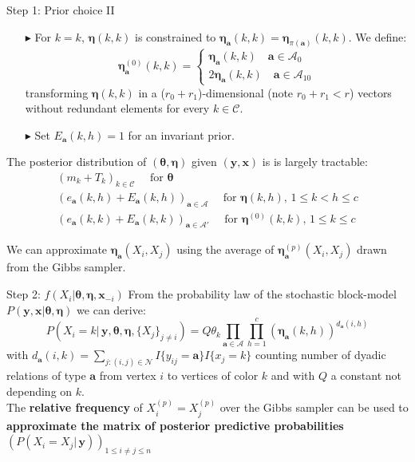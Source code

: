 \documentclass[aspectratio=169,xcolor=dvipsnames]{beamer}
\newcommand{\veca}{\boldsymbol{a}}
\newcommand{\setn}{\mathcal{N}}
\newcommand{\seta}{\mathcal{A}}
\newcommand{\setc}{\mathcal{C}}
\newcommand{\vecx}{\textbf{x}}
\newcommand{\vecy}{\textbf{y}}
\newcommand{\veceta}{\boldsymbol{\eta}}
\newcommand{\vectheta}{\boldsymbol{\theta}}
\begin{document}
\begin{frame}{Step 1: Prior choice II}
\begin{itemize}
        \addtolength{\itemindent}{12pt}
        \item[$\blacktriangleright$] For $k=k$, $\veceta(k,k)$ is constrained to $\veceta_{\veca}(k,k) = \veceta_{\pi(\veca)}(k,k)$. We  define:
        $$
        \veceta^{(0)}_{\veca}(k,k) =
        \begin{cases} 
        \veceta_{\veca}(k,k) \quad \veca \in \seta_0 \\
        2\veceta_{\veca}(k,k) \quad \veca \in \seta_{10}
        \end{cases}
        $$
        transforming $\veceta(k,k)$ in a ($r_0+r_1$)-dimensional (note $r_0+r_1<r$) vectors without redundant elements for every $k \in \setc$.

         
        \item[$\blacktriangleright$] Set $E_{\veca}(k,h)=1$ for an invariant prior. 
\end{itemize}
The posterior distribution of $(\vectheta, \veceta)$ given $(\vecy, \vecx)$ is  is largely tractable:
\begin{gather*}
    (m_k + T_k)_{k \in \setc} \quad \text{ for } \vectheta \\
    (e_{\veca}(k,h) + E_{\veca}(k,h))_{\veca \in \seta } \quad \text{ for } \veceta(k,h), \, 1\leq k < h \leq c \\
    (e_{\veca}(k,k) + E_{\veca}(k,k))_{\veca \in \seta'} \quad \text{ for } \veceta^{(0)}(k,k), \, 1\leq k\leq c
\end{gather*}

We can approximate $\veceta_{\veca}(X_i,X_j)$ using the average of $\veceta^{(p)}_{\veca}(X_i,X_j)$ drawn from the Gibbs sampler.
    
\end{frame}
\begin{frame}{Step 2: $f(X_i| \vectheta, \veceta, \vecx_{-i})$}
From the probability law of the stochastic block-model $P(\vecy, \vecx | \vectheta, \veceta) $ we can derive:
$$
P(X_i = k|\, \vecy, \vectheta, \veceta, \{X_j\}_{j\neq i})= Q\theta_k\prod_{\veca\in\seta}\prod_{h=1}^c (\veceta_{\veca}(k, h))^{d_{\veca}(i, h)}
$$
with $d_{\veca}(i, k) = \sum_{j:(i,j)\in\setn} I\{y_{ij} = \veca\}I\{x_j=k\}$  counting number of dyadic relations of type $\veca$ from vertex $i$ to vertices of color $k$ and with $Q$ a constant not depending on $k$.\\ 
\vspace{15pt}
The \textbf{relative frequency} of $X^{(p)}_i=X^{(p)}_j$ over the Gibbs sampler can be used to \textbf{approximate the matrix of posterior predictive probabilities} $ (P(X_i=X_j | \, \vecy))_{1\leq i \neq j \leq n}$
\vspace{30pt}
\end{frame}
\end{document}

